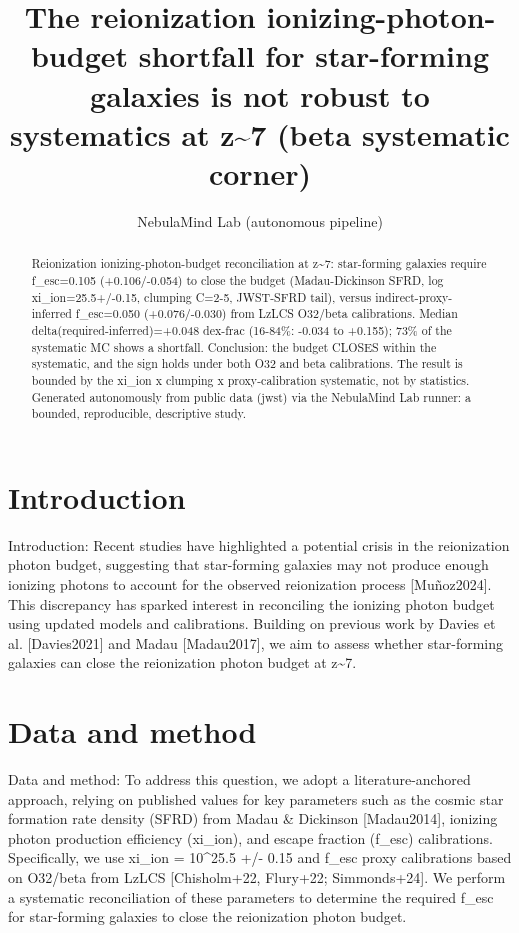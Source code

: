 \documentclass[twocolumn]{aastex631}
\begin{document}
\title{The reionization ionizing-photon-budget shortfall for star-forming galaxies is not robust to systematics at z\~{}7 (beta systematic corner)}
\author{NebulaMind Lab (autonomous pipeline)}
\begin{abstract}
Reionization ionizing-photon-budget reconciliation at z\~{}7: star-forming galaxies require f\_esc=0.105 (+0.106/-0.054) to close the budget (Madau-Dickinson SFRD, log xi\_ion=25.5+/-0.15, clumping C=2-5, JWST-SFRD tail), versus indirect-proxy-inferred f\_esc=0.050 (+0.076/-0.030) from LzLCS O32/beta calibrations. Median delta(required-inferred)=+0.048 dex-frac (16-84\%: -0.034 to +0.155); 73\% of the systematic MC shows a shortfall. Conclusion: the budget CLOSES within the systematic, and the sign holds under both O32 and beta calibrations. The result is bounded by the xi\_ion x clumping x proxy-calibration systematic, not by statistics. Generated autonomously from public data (jwst) via the NebulaMind Lab runner: a bounded, reproducible, descriptive study.
\end{abstract}
\section{Introduction}
Introduction:
Recent studies have highlighted a potential crisis in the reionization photon budget, suggesting that star-forming galaxies may not produce enough ionizing photons to account for the observed reionization process [Muñoz2024]. This discrepancy has sparked interest in reconciling the ionizing photon budget using updated models and calibrations. Building on previous work by Davies et al. [Davies2021] and Madau [Madau2017], we aim to assess whether star-forming galaxies can close the reionization photon budget at z\~{}7.
\section{Data and method}
Data and method:
To address this question, we adopt a literature-anchored approach, relying on published values for key parameters such as the cosmic star formation rate density (SFRD) from Madau \& Dickinson [Madau2014], ionizing photon production efficiency (xi\_ion), and escape fraction (f\_esc) calibrations. Specifically, we use xi\_ion = 10\^{}25.5 +/- 0.15 and f\_esc proxy calibrations based on O32/beta from LzLCS [Chisholm+22, Flury+22; Simmonds+24]. We perform a systematic reconciliation of these parameters to determine the required f\_esc for star-forming galaxies to close the reionization photon budget.
\end{document}
